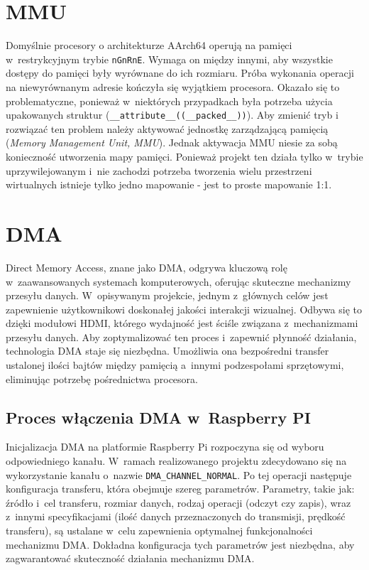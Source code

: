 \documentclass[shortabstract]{iithesis}
\begin{document}
\section{MMU}
Domyślnie procesory o architekturze AArch64 operują na pamięci w~restrykcyjnym trybie \texttt{nGnRnE}. Wymaga on między innymi, aby wszystkie dostępy do pamięci były wyrównane do ich rozmiaru. Próba wykonania operacji na niewyrównanym adresie kończyła się wyjątkiem procesora. Okazało się to problematyczne, ponieważ w~niektórych przypadkach była potrzeba użycia upakowanych struktur (\texttt{\_\_attribute\_\_((\_\_packed\_\_))}). Aby zmienić tryb i rozwiązać ten problem należy aktywować jednostkę zarządzającą pamięcią (\textit{Memory Management Unit, MMU}). Jednak aktywacja MMU niesie za sobą konieczność utworzenia mapy pamięci. Ponieważ projekt ten działa tylko w~trybie uprzywilejowanym i~nie zachodzi potrzeba tworzenia wielu przestrzeni wirtualnych istnieje tylko jedno mapowanie - jest to proste mapowanie 1:1.

\section{DMA}
Direct Memory Access, znane jako DMA, odgrywa kluczową rolę w~zaawansowanych systemach komputerowych, oferując skuteczne mechanizmy przesyłu danych. W~opisywanym projekcie, jednym z~głównych celów jest zapewnienie użytkownikowi doskonałej jakości interakcji wizualnej. Odbywa się to dzięki modułowi HDMI, którego wydajność jest ściśle związana z~mechanizmami przesyłu danych. Aby zoptymalizować ten proces i~zapewnić płynność działania, technologia DMA staje się niezbędna. Umożliwia ona bezpośredni transfer ustalonej ilości bajtów między pamięcią a~innymi podzespołami sprzętowymi, eliminując potrzebę pośrednictwa procesora.
\subsection{Proces włączenia DMA w~Raspberry PI}
Inicjalizacja DMA na platformie Raspberry Pi rozpoczyna się od wyboru odpowiedniego kanału. W~ramach realizowanego projektu zdecydowano się na wykorzystanie kanału o~nazwie \texttt{DMA\_CHANNEL\_NORMAL}. Po tej operacji następuje konfiguracja transferu, która obejmuje szereg parametrów. Parametry, takie jak: źródło i~cel transferu, rozmiar danych, rodzaj operacji (odczyt czy zapis), wraz z~innymi specyfikacjami (ilość danych przeznaczonych do transmisji, prędkość transferu), są ustalane w~celu zapewnienia optymalnej funkcjonalności mechanizmu DMA. Dokładna konfiguracja tych parametrów jest niezbędna, aby zagwarantować skuteczność działania mechanizmu DMA.
\end{document}
